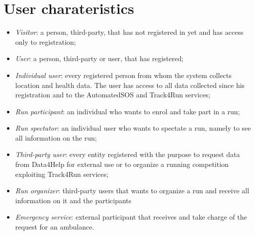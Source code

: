 \section{User charateristics}
\begin{itemize}
\item	\textit{Visitor}: a person, third-party, that has not registered in yet and has access only to registration;
\item	\textit{User}:  a person, third-party or user, that has registered;
\item	\textit{Individual user}: every registered person from whom the system collects location and health data. The user has access to all data collected since his registration and to the AutomatedSOS and Track4Run services;
\item	\textit{Run participant}: an individual who wants to enrol and take part in a run;
\item	\textit{Run spectator}: an individual user who wants to spectate a run, namely to see all information on the run;
\item \textit{Third-party user}: every entity registered with the purpose to request data from Data4Help for external use or to organize a running competition exploiting Track4Run services;
\item	\textit{Run organizer}: third-party users that wants to organize a run and receive all information on it and the participants
\item	\textit{Emergency service}: external participant that receives and take charge of the request for an ambulance.
\end{itemize}

